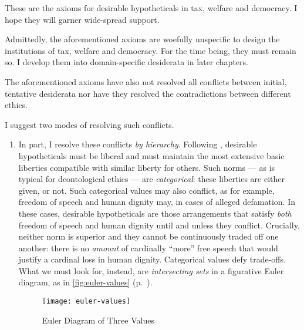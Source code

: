These are the axioms for desirable hypotheticals in tax, welfare and democracy.
I hope they will garner wide-spread support.

Admittedly, the aforementioned axioms are woefully unspecific to design the institutions of tax, welfare and democracy. 
For the time being, they must remain so.
I develop them into domain-specific desiderata in later chapters.

The aforementioned axioms have also not resolved all conflicts between initial, tentative desiderata nor have they resolved the contradictions between different ethics.

I suggest two modes of resolving such conflicts.

\begin{enumerate}
	\item 
		In part, I resolve these conflicts \emph{by hierarchy}. 
		Following \citeauthor{Rawls-1971-aa}, desirable hypotheticals must be liberal and must maintain the most extensive basic liberties compatible with similar liberty for others. 
		Such norms --- as is typical for deontological ethics --- are \emph{categorical}: these liberties are either given, or not.
		Such categorical values may also conflict, as for example, freedom of speech and human dignity may, in cases of alleged defamation.
		In these cases, desirable hypotheticals are those arrangements that satisfy \emph{both} freedom of speech and human dignity until and unless they conflict.
		Crucially, neither norm is superior and they cannot be continuously traded off one another: there is no \emph{amount} of cardinally ``more'' free speech that would justify a cardinal loss in human dignity.
		Categorical values defy trade-offs.
		What we must look for, instead, are \emph{intersecting sets} in a figurative Euler diagram, as in \autoref{fig:euler-values} (p.~\pageref{fig:euler-values}).

		\begin{figure}[htbp]
			\centering
			\texttt{[image: euler-values]}  
			\caption{Euler Diagram of Three Values}
			\label{fig:euler-values}
		\end{figure}


\end{enumerate}
